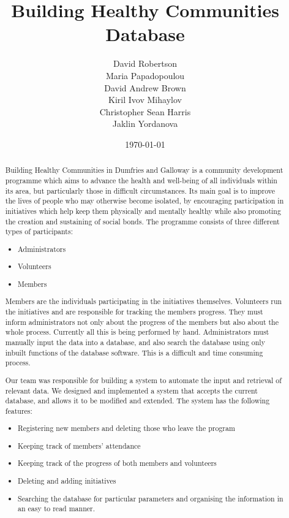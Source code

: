 \documentclass{l3proj}
\begin{document}
\title{Building Healthy Communities Database}

\author{David Robertson \\
Maria Papadopoulou \\
David Andrew Brown \\
Kiril Ivov Mihaylov \\
Christopher Sean Harris \\
Jaklin Yordanova}

\date{\today}

\maketitle

\begin{abstract}

Building Healthy Communities in Dumfries and Galloway is a community development programme which aims to advance the health and well-being of all individuals within its area, but particularly those in difficult circumstances. Its main goal is to improve the lives of people who may otherwise become isolated, by encouraging participation in initiatives which help keep them physically and mentally healthy while also promoting the creation and sustaining of social bonds. The programme consists of three different types of participants:
\begin{itemize}
	\item Administrators
	\item Volunteers
	\item Members
\end{itemize}
Members are the individuals participating in the initiatives themselves. Volunteers run the initiatives and are responsible for tracking the members progress. They must inform administrators not only about the progress of the members but also about the whole process. Currently all this is being performed by hand. Administrators must manually input the data into a database, and also search the database using only inbuilt functions of the database software. This is a difficult and time consuming process. 

Our team was responsible for building a system to automate the input and retrieval of relevant data. We designed and implemented a system that accepts the current database, and allows it to be modified and extended. The system has the following features:
\begin{itemize}
	\item Registering new members and deleting those who leave the program
	\item Keeping track of members' attendance
	\item Keeping track of the progress of both members and volunteers
	\item Deleting and adding initiatives
	\item Searching the database for particular parameters and organising the information in an easy to read manner.
\end{itemize} 

\end{abstract}
\end{document}

